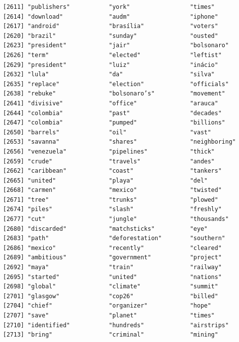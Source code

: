 \documentclass[
  letterpaper,
  DIV=11,
  numbers=noendperiod]{scrartcl}
\begin{document}
\begin{verbatim}
[2611] "publishers"           "york"                 "times"               
[2614] "download"             "audm"                 "iphone"              
[2617] "android"              "brasília"             "voters"              
[2620] "brazil"               "sunday"               "ousted"              
[2623] "president"            "jair"                 "bolsonaro"           
[2626] "term"                 "elected"              "leftist"             
[2629] "president"            "luiz"                 "inácio"              
[2632] "lula"                 "da"                   "silva"               
[2635] "replace"              "election"             "officials"           
[2638] "rebuke"               "bolsonaro’s"          "movement"            
[2641] "divisive"             "office"               "arauca"              
[2644] "colombia"             "past"                 "decades"             
[2647] "colombia"             "pumped"               "billions"            
[2650] "barrels"              "oil"                  "vast"                
[2653] "savanna"              "shares"               "neighboring"         
[2656] "venezuela"            "pipelines"            "thick"               
[2659] "crude"                "travels"              "andes"               
[2662] "caribbean"            "coast"                "tankers"             
[2665] "united"               "playa"                "del"                 
[2668] "carmen"               "mexico"               "twisted"             
[2671] "tree"                 "trunks"               "plowed"              
[2674] "piles"                "slash"                "freshly"             
[2677] "cut"                  "jungle"               "thousands"           
[2680] "discarded"            "matchsticks"          "eye"                 
[2683] "path"                 "deforestation"        "southern"            
[2686] "mexico"               "recently"             "cleared"             
[2689] "ambitious"            "government"           "project"             
[2692] "maya"                 "train"                "railway"             
[2695] "started"              "united"               "nations"             
[2698] "global"               "climate"              "summit"              
[2701] "glasgow"              "cop26"                "billed"              
[2704] "chief"                "organizer"            "hope"                
[2707] "save"                 "planet"               "times"               
[2710] "identified"           "hundreds"             "airstrips"           
[2713] "bring"                "criminal"             "mining"              

\end{verbatim}
\end{document}
